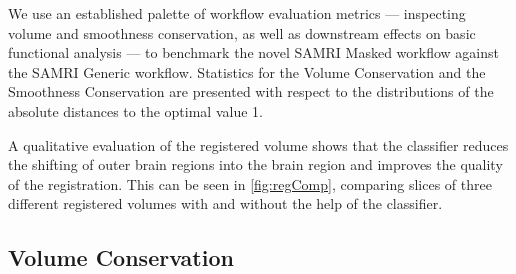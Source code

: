 We use an established palette of workflow evaluation metrics --- inspecting volume and smoothness conservation, as well as downstream effects on basic functional analysis \citep{ioanas_optimized_2019} --- to benchmark the novel SAMRI Masked workflow against the SAMRI Generic workflow.
Statistics for the Volume Conservation and the Smoothness Conservation are presented with respect to the distributions of the absolute distances to the optimal value 1.

A qualitative evaluation of the registered volume shows that the classifier reduces the shifting of outer brain regions into the brain region and improves the quality of the registration.
This can be seen in \cref{fig:regComp}, comparing slices of three different registered volumes with and without the help of the classifier.

\subsection{Volume Conservation}

